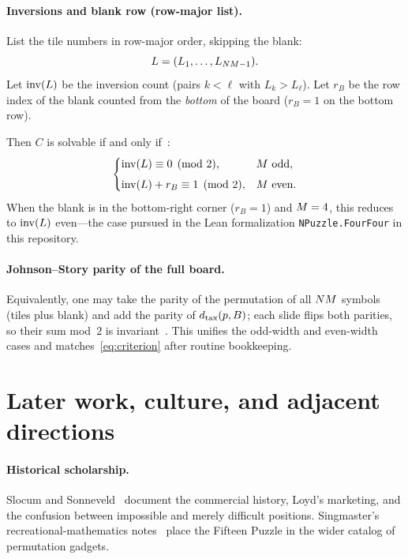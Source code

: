 \paragraph{Inversions and blank row (row-major list).}
List the tile numbers in row-major order, skipping the blank:
\[
  L = (L_1,\ldots,L_{NM-1}).
\]
Let $\operatorname{inv}(L)$ be the inversion count (pairs $k<\ell$ with $L_k > L_\ell$).
Let $r_B$ be the row index of the blank counted from the \emph{bottom} of the board ($r_B=1$ on the bottom row).

Then $C$ is solvable if and only if~\cite{Wikipedia15Puzzle,CutTheKnotFifteen}:
\begin{equation}\label{eq:criterion}
  \begin{cases}
    \operatorname{inv}(L) \equiv 0 \pmod 2, & M \text{ odd},\\[0.4em]
    \operatorname{inv}(L) + r_B \equiv 1 \pmod 2, & M \text{ even}.
  \end{cases}
\end{equation}
When the blank is in the bottom-right corner ($r_B=1$) and $M=4$, this reduces to $\operatorname{inv}(L)$ even---the case pursued in the Lean formalization \texttt{NPuzzle.FourFour} in this repository.

\paragraph{Johnson--Story parity of the full board.}
Equivalently, one may take the parity of the permutation of all $NM$ symbols (tiles plus blank) and add the parity of $d_{\mathrm{tax}}(p,B)$; each slide flips both parities, so their sum mod~$2$ is invariant~\cite{JohnsonStory1879,Wikipedia15Puzzle}.
This unifies the odd-width and even-width cases and matches~\eqref{eq:criterion} after routine bookkeeping.

\section{Later work, culture, and adjacent directions}\label{sec:later}

\paragraph{Historical scholarship.}
Slocum and Sonneveld~\cite{SlocumSonneveld2006} document the commercial history, Loyd's marketing, and the confusion between impossible and merely difficult positions.
Singmaster's recreational-mathematics notes~\cite{SingmasterNotes} place the Fifteen Puzzle in the wider catalog of permutation gadgets.

